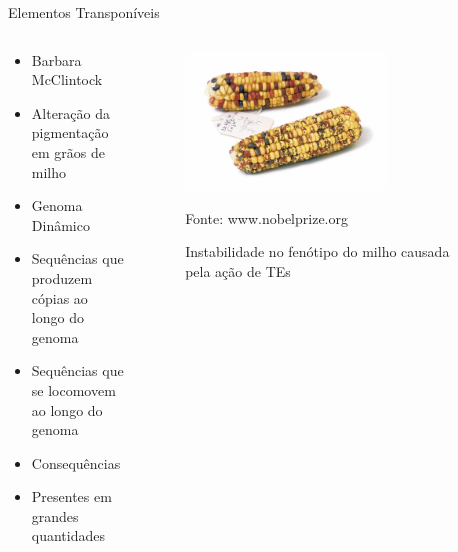 \documentclass[%
  xcolor=table,%
  10pt,%
  aspectratio = 169,%
  compress,%
  t,%
]{beamer}%
\begin{document}
\begin{frame}{}{Elementos Transponíveis}
    \begin{columns}
        \begin{column}{0.5\textwidth}
            \begin{itemize}
                \item Barbara McClintock
                \item Alteração da pigmentação em grãos de milho
                \item Genoma Dinâmico
                \item Sequências que produzem cópias ao longo do genoma
                \item Sequências que se locomovem ao longo do genoma
                \item Consequências
                \item Presentes em grandes quantidades
            \end{itemize}       
        \end{column}
        \begin{column}{0.5\textwidth}  %
            \begin{center}
                \begin{figure}
                    \centering
                    \includegraphics[width = 0.7\textwidth]{./Figuras/te-maize.jpg}
                    \caption{Instabilidade no fenótipo do milho causada pela ação de TEs}
                    \scriptsize Fonte: www.nobelprize.org %
                    \label{fig:maize-phenotype-instability}
                \end{figure}
             \end{center}
        \end{column}
    \end{columns}
\end{frame}
\end{document}
